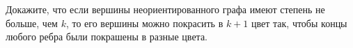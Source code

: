 Докажите, что если вершины неориентированного графа имеют степень не больше, чем $k$, то его вершины
можно покрасить в $k + 1$ цвет так, чтобы концы любого ребра были покрашены в разные цвета.
